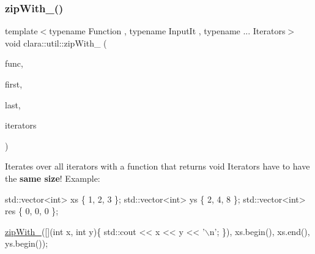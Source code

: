 \subsubsection{\texorpdfstring{zip\+With\+\_\+()}{zipWith\_()}}
{\footnotesize\ttfamily template$<$typename Function , typename Input\+It , typename ... Iterators$>$ \\
void clara\+::util\+::zip\+With\+\_\+ (\begin{DoxyParamCaption}\item[{Function}]{func,  }\item[{Input\+It}]{first,  }\item[{Input\+It}]{last,  }\item[{Iterators ...}]{iterators }\end{DoxyParamCaption})}



Iterates over all iterators with a function that returns void Iterators have to have the {\bfseries same size}! Example\+: 


\begin{DoxyCode}
std::vector<int> xs \{ 1, 2, 3 \};
std::vector<int> ys \{ 2, 4, 8 \};
std::vector<int> res \{ 0, 0, 0 \};

\hyperlink{namespaceclara_1_1util_aeb41a8f553acc4a836cabbcad96e1007}{zipWith\_}([](\textcolor{keywordtype}{int} x, \textcolor{keywordtype}{int} y)\{ std::cout << x << y << \textcolor{charliteral}{'\(\backslash\)n'}; \}),
         xs.begin(),
         xs.end(),
         ys.begin());
\end{DoxyCode}
 